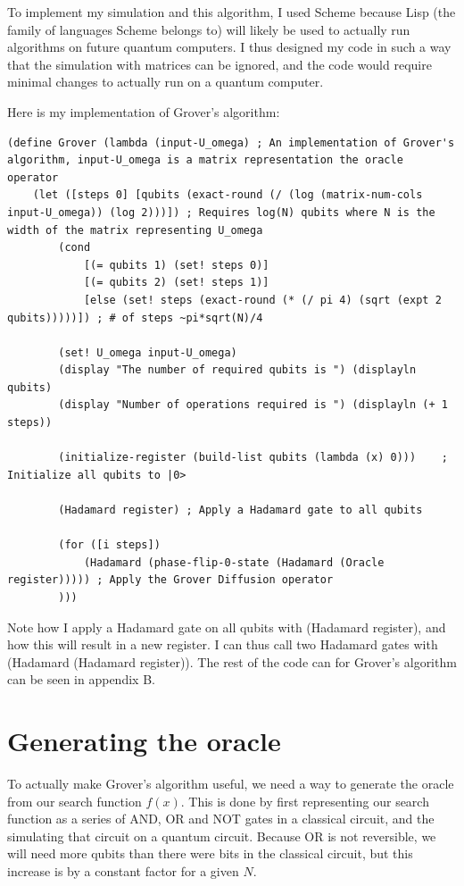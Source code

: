 \documentclass[11pt]{article}
\begin{document}
To implement my simulation and this algorithm, I used Scheme because Lisp (the family of languages Scheme belongs to) will likely be used to actually run algorithms on future quantum computers. I thus designed my code in such a way that the simulation with matrices can be ignored, and the code would require minimal changes to actually run on a quantum computer.

Here is my implementation of Grover's algorithm:

\begin{lstlisting}
(define Grover (lambda (input-U_omega) ; An implementation of Grover's algorithm, input-U_omega is a matrix representation the oracle operator
	(let ([steps 0] [qubits (exact-round (/ (log (matrix-num-cols input-U_omega)) (log 2)))]) ; Requires log(N) qubits where N is the width of the matrix representing U_omega
		(cond
			[(= qubits 1) (set! steps 0)]
			[(= qubits 2) (set! steps 1)]
			[else (set! steps (exact-round (* (/ pi 4) (sqrt (expt 2 qubits)))))]) ; # of steps ~pi*sqrt(N)/4

		(set! U_omega input-U_omega)
		(display "The number of required qubits is ") (displayln qubits)
		(display "Number of operations required is ") (displayln (+ 1 steps))

		(initialize-register (build-list qubits (lambda (x) 0)))	; Initialize all qubits to |0>

		(Hadamard register)	; Apply a Hadamard gate to all qubits

		(for ([i steps])
			(Hadamard (phase-flip-0-state (Hadamard (Oracle register))))) ; Apply the Grover Diffusion operator
		)))
\end{lstlisting}

Note how I apply a Hadamard gate on all qubits with (Hadamard register), and how this will result in a new register. I can thus call two Hadamard gates with (Hadamard (Hadamard register)). The rest of the code can for Grover's algorithm can be seen in appendix B.

\section{Generating the oracle}

To actually make Grover's algorithm useful, we need a way to generate the oracle from our search function $f(x)$. This is done by first representing our search function as a series of AND, OR and NOT gates in a classical circuit, and the simulating that circuit on a quantum circuit. Because OR is not reversible, we will need more qubits than there were bits in the classical circuit, but this increase is by a constant factor for a given $N$.
\end{document}

